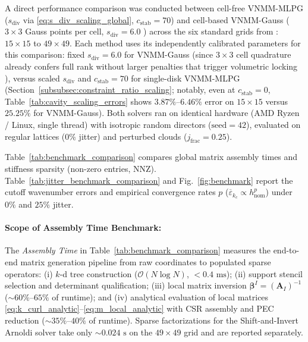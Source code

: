 \documentclass[VANCOUVER,Times1COL]{WileyNJD-v5}
\begin{document}
A direct performance comparison was conducted between cell-free VNMM-MLPG ($s_{\mathrm{div}}$ via \eqref{eq:s_div_scaling_global}, $c_{\mathrm{stab}} = 70$) and cell-based VNMM-Gauss ($3 \times 3$ Gauss points per cell, $s_{\mathrm{div}} = 6.0$ \cite{stable_vnmm2d_2026}) across the six standard grids from \cite{stable_vnmm2d_2026}: $15 \times 15$ to $49 \times 49$. Each method uses its independently calibrated parameters for this comparison: fixed $s_{\mathrm{div}} = 6.0$ for VNMM-Gauss (since $3\times 3$ cell quadrature already confers full rank without larger penalties that trigger volumetric locking \cite{stable_vnmm2d_2026}), versus scaled $s_{\mathrm{div}}$ and $c_{\mathrm{stab}} = 70$ for single-disk VNMM-MLPG (Section~\ref{subsubsec:constraint_ratio_scaling}; notably, even at $c_{\mathrm{stab}} = 0$, Table~\ref{tab:cavity_scaling_errors} shows $3.87\%\text{--}6.46\%$ error on $15\times 15$ versus $25.25\%$ for VNMM-Gauss). Both solvers ran on identical hardware (AMD Ryzen / Linux, single thread) with isotropic random directors ($\text{seed}=42$), evaluated on regular lattices ($0\%$ jitter) and perturbed clouds ($j_{\mathrm{frac}} = 0.25$).

Table~\ref{tab:benchmark_comparison} compares global matrix assembly times and stiffness sparsity (non-zero entries, NNZ). Table~\ref{tab:jitter_benchmark_comparison} and Fig.~\ref{fig:benchmark} report the cutoff wavenumber errors and empirical convergence rates $p$ ($\overline{\varepsilon}_{k_c} \propto h_{\mathrm{nom}}^p$) under $0\%$ and $25\%$ jitter.

\paragraph*{Scope of Assembly Time Benchmark:}
The \emph{Assembly Time} in Table~\ref{tab:benchmark_comparison} measures the end-to-end matrix generation pipeline from raw coordinates to populated sparse operators: (i) $k$-d tree construction ($\mathcal{O}(N \log N)$, $< 0.4\text{ ms}$); (ii) support stencil selection and determinant qualification; (iii) local matrix inversion $\boldsymbol{\beta}^I = (\mathbf{A}_I)^{-1}$ ($\sim 60\%\text{--}65\%$ of runtime); and (iv) analytical evaluation of local matrices \eqref{eq:k_curl_analytic}--\eqref{eq:m_local_analytic} with CSR assembly and PEC reduction ($\sim 35\%\text{--}40\%$ of runtime). Sparse factorizations for the Shift-and-Invert Arnoldi solver take only $\sim 0.024\text{ s}$ on the $49\times 49$ grid and are reported separately.
\end{document}
